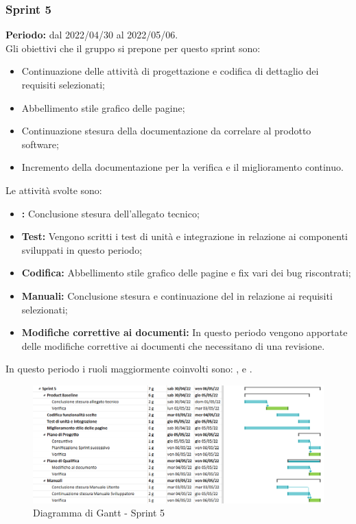 \subsubsection{Sprint 5} \label{subsubsection:sprint_5}
\textbf{Periodo:} dal 2022/04/30 al 2022/05/06.
\bigskip
\\Gli obiettivi che il gruppo si prepone per questo sprint\glo{} sono:
\begin{itemize}
  \item Continuazione delle attività di progettazione e codifica di dettaglio dei requisiti selezionati;
  \item Abbellimento stile grafico delle pagine;
  \item Continuazione stesura della documentazione da correlare al prodotto software;
  \item Incremento della documentazione per la verifica e il miglioramento continuo.
\end{itemize}
Le attività svolte sono:
\begin{itemize}
  \item \textbf{\PB{}:} Conclusione stesura dell’allegato tecnico;
  \item \textbf{Test:} Vengono scritti i test di unità e integrazione in relazione ai componenti sviluppati in questo periodo;
  \item \textbf{Codifica:} Abbellimento stile grafico delle pagine e fix vari dei bug\glo{} riscontrati;
  \item \textbf{Manuali:} Conclusione stesura \docNameVersionMU{} e continuazione del \docNameVersionMS{} in relazione ai requisiti selezionati;
  \item \textbf{Modifiche correttive ai documenti:} In questo periodo vengono apportate delle modifiche correttive ai documenti che necessitano di una revisione.
\end{itemize}
In questo periodo i ruoli maggiormente coinvolti sono: \roleDesignerLow{}, \roleProgrammerLow{} e \roleVerifierLow{}.
\begin{figure}[H]
  \centering
  \includegraphics[scale=0.55]{immagini/5sprint.png}
  \caption{Diagramma di Gantt - Sprint 5}
\end{figure}

